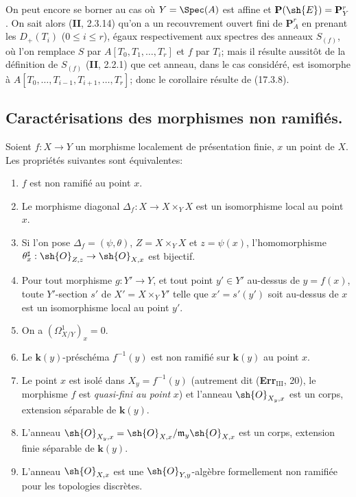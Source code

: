On peut encore se borner au cas où $Y=\Spec(A)$ est affine et $\mathbf{P}(\sh{E})=\mathbf{P}^r_Y$. On sait alors (\textbf{II}, 2.3.14) qu'on a un recouvrement ouvert fini de $\mathbf{P}^r_A$ en prenant les $D_+(T_i)$ ($0\leq i\leq r$), égaux respectivement aux spectres des anneaux $S_{(f)}$, où l'on remplace $S$ par $A[T_0,T_1,\ldots,T_r]$ et $f$ par $T_i$; mais il résulte aussitôt de la définition de $S_{(f)}$ (\textbf{II}, 2.2.1) que cet anneau, dans le cas considéré, est isomorphe à $A[T_0,\ldots,T_{i-1},T_{i+1},\ldots,T_r]$; donc le corollaire résulte de (17.3.8).


\subsection{Caractérisations des morphismes non ramifiés.}

\begin{theorem}[17.4.1]
\label{IV.17.4.1}
Soient $f:X\to Y$ un morphisme localement de présentation finie, $x$ un point de $X$. Les propriétés suivantes sont équivalentes:
\begin{enumerate}
  \item[\textup{a)}] $f$ est non ramifié au point $x$.
  \item[\textup{b)}] Le morphisme diagonal $\Delta_f:X\to X\times_Y X$ est un isomorphisme local au point $x$.
  \item[\textup{b$'$)}] Si l'on pose $\Delta_f=(\psi,\theta)$, $Z=X\times_Y X$ et $z=\psi(x)$, l'homomorphisme $\theta_x^\sharp:\sh{O}_{Z,z}\to\sh{O}_{X,x}$ est bijectif.
  \item[\textup{b$''$)}] Pour tout morphisme $g:Y'\to Y$, et tout point $y'\in Y'$ au-dessus de $y=f(x)$, toute $Y'$-section $s'$ de $X'=X\times_Y Y'$ telle que $x'=s'(y')$ soit au-dessus de $x$ est un isomorphisme local au point $y'$.
  \item[\textup{c)}] On a $(\varOmega^1_{X/Y})_x=0$.
  \item[\textup{d)}] Le $\boldsymbol{k}(y)$-préschéma $f^{-1}(y)$ est non ramifié sur $\boldsymbol{k}(y)$ au point $x$.
  \item[\textup{d$'$)}] Le point $x$ est isolé dans $X_y=f^{-1}(y)$ \textup{(autrement dit (\textbf{Err}$_{\mathrm{III}}$, 20), le morphisme $f$ est \emph{quasi-fini au point} $x$)} et l'anneau $\sh{O}_{X_y,x}$ est un corps, extension séparable de $\boldsymbol{k}(y)$.
  \item[\textup{d$''$)}] L'anneau $\sh{O}_{X_y,x}=\sh{O}_{X,x}/\mathfrak{m}_y\sh{O}_{X,x}$ est un corps, extension finie séparable de $\boldsymbol{k}(y)$.
  \item[\textup{e)}] L'anneau $\sh{O}_{X,x}$ est une $\sh{O}_{Y,y}$-algèbre formellement non ramifiée pour les topologies discrètes.
\end{enumerate}
\end{theorem}

